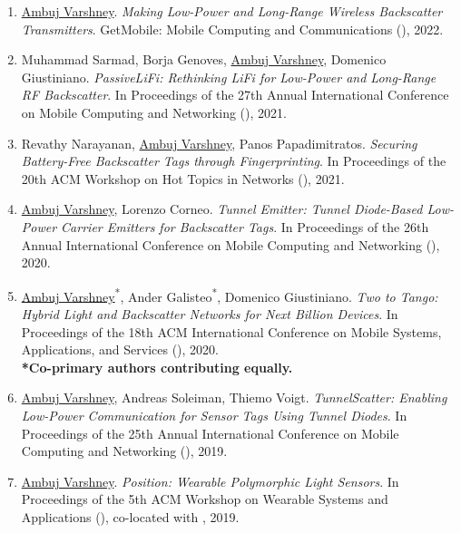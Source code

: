 \begin{enumerate}
\item \underline{Ambuj Varshney}. 
\emph{Making Low-Power and Long-Range Wireless Backscatter Transmitters}. 
GetMobile: Mobile Computing and Communications (), 2022.


\item Muhammad Sarmad, Borja Genoves, \underline{Ambuj Varshney}, Domenico Giustiniano. 
\emph{PassiveLiFi: Rethinking LiFi for Low-Power and Long-Range RF Backscatter}. 
In Proceedings of the 27th Annual International Conference on Mobile Computing and Networking (), 2021.

\item Revathy Narayanan, \underline{Ambuj Varshney}, Panos Papadimitratos. 
\emph{Securing Battery-Free Backscatter Tags through Fingerprinting}. 
In Proceedings of the 20th ACM Workshop on Hot Topics in Networks (), 2021.


\item \underline{Ambuj Varshney}, Lorenzo Corneo. 
\emph{Tunnel Emitter: Tunnel Diode-Based Low-Power Carrier Emitters for Backscatter Tags}. 
In Proceedings of the 26th Annual International Conference on Mobile Computing and Networking (), 2020.

\item \underline{Ambuj Varshney}\textsuperscript{*}, Ander Galisteo\textsuperscript{*}, Domenico Giustiniano. 
\emph{Two to Tango: Hybrid Light and Backscatter Networks for Next Billion Devices}. 
In Proceedings of the 18th ACM International Conference on Mobile Systems, Applications, and Services (), 2020.\\
\textbf{*Co-primary authors contributing equally.}


\item \underline{Ambuj Varshney}, Andreas Soleiman\pg, Thiemo Voigt.
\emph{TunnelScatter: Enabling Low-Power Communication for Sensor Tags Using Tunnel Diodes}.
In Proceedings of the 25th Annual International Conference on Mobile Computing and Networking (), 2019.

\item \underline{Ambuj Varshney}. 
\emph{Position: Wearable Polymorphic Light Sensors}. 
In Proceedings of the 5th ACM Workshop on Wearable Systems and Applications (), co-located with , 2019.


\end{enumerate}
